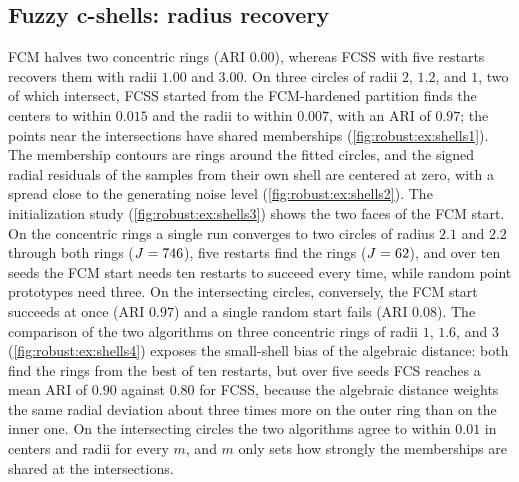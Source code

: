 \subsection{Fuzzy c-shells: radius recovery}\label{sec:robust:ex:shells}

FCM halves two concentric rings (ARI $0.00$), whereas FCSS with five restarts recovers them with radii $1.00$ and $3.00$. On three circles of radii $2$, $1.2$, and $1$, two of which intersect, FCSS started from the FCM-hardened partition finds the centers to within $0.015$ and the radii to within $0.007$, with an ARI of $0.97$; the points near the intersections have shared memberships (\cref{fig:robust:ex:shells1}). The membership contours are rings around the fitted circles, and the signed radial residuals of the samples from their own shell are centered at zero, with a spread close to the generating noise level (\cref{fig:robust:ex:shells2}). The initialization study (\cref{fig:robust:ex:shells3}) shows the two faces of the FCM start. On the concentric rings a single run converges to two circles of radius $2.1$ and $2.2$ through both rings ($J=746$), five restarts find the rings ($J=62$), and over ten seeds the FCM start needs ten restarts to succeed every time, while random point prototypes need three. On the intersecting circles, conversely, the FCM start succeeds at once (ARI $0.97$) and a single random start fails (ARI $0.08$). The comparison of the two algorithms on three concentric rings of radii $1$, $1.6$, and $3$ (\cref{fig:robust:ex:shells4}) exposes the small-shell bias of the algebraic distance: both find the rings from the best of ten restarts, but over five seeds FCS reaches a mean ARI of $0.90$ against $0.80$ for FCSS, because the algebraic distance weights the same radial deviation about three times more on the outer ring than on the inner one. On the intersecting circles the two algorithms agree to within $0.01$ in centers and radii for every $m$, and $m$ only sets how strongly the memberships are shared at the intersections.


